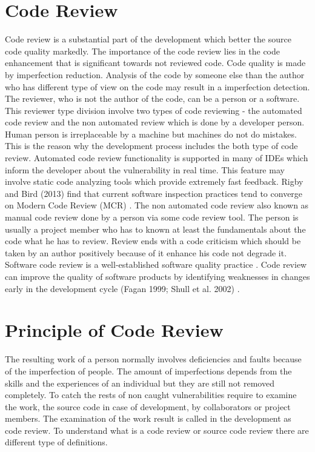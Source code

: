 \section{Code Review}

Code review is a substantial part of the development which better the source code quality markedly. The importance of the code review lies in the code enhancement that is significant towards not reviewed code. Code quality is made by imperfection reduction. Analysis of the code by someone else than the author who has different type of view on the code may result in a imperfection detection. The reviewer, who is not the author of the code, can be a person or a software. This reviewer type division involve two types of code reviewing - the automated code review and the non automated review which is done by a developer person. Human person is irreplaceable by a machine but machines do not do mistakes. This is the reason why the development process includes the both type of code review. Automated code review functionality is supported in many of IDEs which inform the developer about the vulnerability in real time. This feature may involve static code analyzing tools which provide extremely fast feedback. Rigby and Bird (2013) find that current software inspection practices tend to converge on Modern Code Review (MCR) \cite{review_participation}. The non automated code review also known as manual code review done by a person via some code review tool. The person is usually a project member who has to known at least the fundamentals about the code what he has to review. Review ends with a code criticism which should be taken by an author positively because of it enhance his code not degrade it. Software code review is a well-established software quality practice \cite{review_participation}. Code review can improve the quality of software products by identifying weaknesses in changes early in the development cycle (Fagan 1999; Shull et al. 2002) \cite{review_participation}.

\section{Principle of Code Review}

The resulting work of a person normally involves deficiencies and faults because of the imperfection of people. The amount of imperfections depends from the skills and the experiences of an individual but they are still not removed completely. To catch the rests of non caught vulnerabilities require to examine the work, the source code in case of development, by collaborators or project members. The examination of the work result is called in the development as code review. To understand what is a code review or source code review there are different type of definitions.


